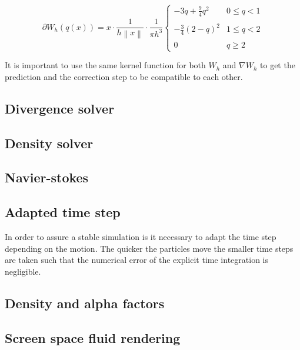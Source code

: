     \begin{equation} \label{eq:gradKernel}
        \partial W_h(q(x)) =  x \cdot \frac{1}{h \left \| x \right \|} \cdot \frac{1}{\pi h^3} \left\{\begin{matrix}
        - 3q + \frac{9}{4}q^2 & 0 \leqslant q < 1 \\ 
        \\
        - \frac{3}{4}(2-q)^2 & 1 \leqslant q < 2\\ 
        \\
        0 & q \geqslant 2
      \end{matrix}\right.
    \end{equation}

    It is important to use the same kernel function for both $W_h$ and $\nabla W_h$ to get the prediction and the correction step to be compatible to each other. 


\subsection{Divergence solver}
\subsection{Density solver}

\subsection{Navier-stokes}
\subsection{Adapted time step}

In order to assure a stable simulation is it necessary to adapt the time step depending on the motion. The quicker the particles move the smaller time steps are taken such that the numerical error of the explicit time integration is negligible.

\subsection{Density and alpha factors}
\subsection{Screen space fluid rendering}


